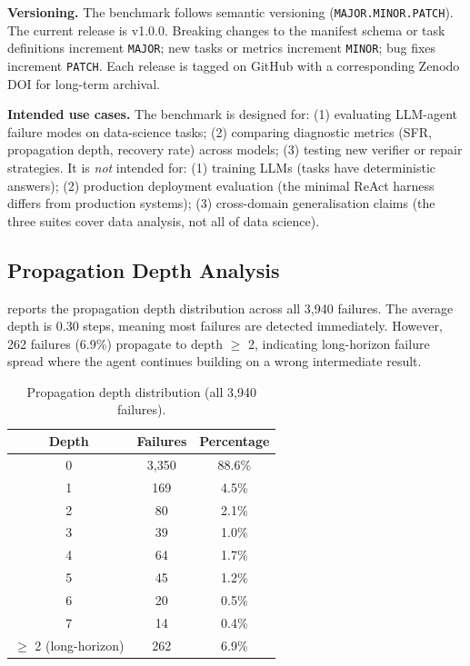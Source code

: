 \textbf{Versioning.} The benchmark follows semantic versioning (\texttt{MAJOR.MINOR.PATCH}). The current release is v1.0.0. Breaking changes to the manifest schema or task definitions increment \texttt{MAJOR}; new tasks or metrics increment \texttt{MINOR}; bug fixes increment \texttt{PATCH}. Each release is tagged on GitHub with a corresponding Zenodo DOI for long-term archival.

\textbf{Intended use cases.} The benchmark is designed for: (1) evaluating LLM-agent failure modes on data-science tasks; (2) comparing diagnostic metrics (SFR, propagation depth, recovery rate) across models; (3) testing new verifier or repair strategies. It is \emph{not} intended for: (1) training LLMs (tasks have deterministic answers); (2) production deployment evaluation (the minimal ReAct harness differs from production systems); (3) cross-domain generalisation claims (the three suites cover data analysis, not all of data science).

\subsection{Propagation Depth Analysis}

 reports the propagation depth distribution across all 3{,}940 failures. The average depth is 0.30 steps, meaning most failures are detected immediately. However, 262 failures (6.9\%) propagate to depth $\geq$ 2, indicating long-horizon failure spread where the agent continues building on a wrong intermediate result.

\begin{table}[t]
\centering
\caption{Propagation depth distribution (all 3{,}940 failures).}
\label{tab:propagation}
\small
\begin{tabular}{@{}ccc@{}}
\toprule
Depth & Failures & Percentage \\
\midrule
0 & 3{,}350 & 88.6\% \\
1 & 169 & 4.5\% \\
2 & 80 & 2.1\% \\
3 & 39 & 1.0\% \\
4 & 64 & 1.7\% \\
5 & 45 & 1.2\% \\
6 & 20 & 0.5\% \\
7 & 14 & 0.4\% \\
\midrule
$\geq$ 2 (long-horizon) & 262 & 6.9\% \\
\bottomrule
\end{tabular}
\end{table}
